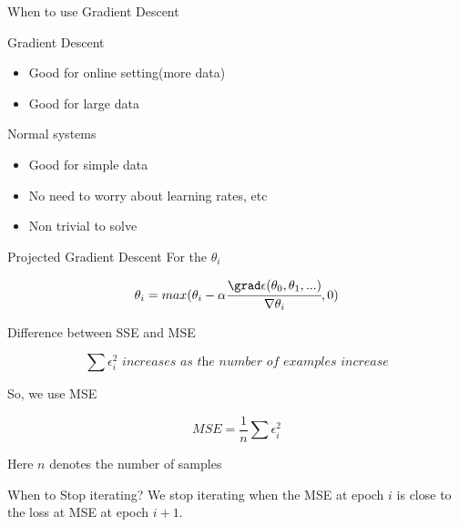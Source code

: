 \documentclass{beamer}
\begin{document}
\begin{frame}{When to use Gradient Descent}


Gradient Descent
\begin{itemize}
    \item Good for online setting(more data)
    \item Good for large data
\end{itemize}


Normal systems
\begin{itemize}
    \item Good for simple data
    \item No need to worry about learning rates, etc
    \item Non trivial to solve
\end{itemize}
\end{frame}



\begin{frame}{Projected Gradient Descent}
    For the $\theta_{i}$
    
    \begin{equation*}
        \theta_{i} = max(\theta_{i} - \alpha \cfrac{\grad \epsilon (\theta_{0},\theta_{1},...)}{ \nabla  \theta_{i}},0)
    \end{equation*}
\end{frame}

\begin{frame}{Difference between SSE and MSE}
    
    
    
    \begin{equation*}
        \sum \epsilon_{i}^{2} \textit{ increases as the number of examples increase}
    \end{equation*}
    
    So, we use MSE
    
    \begin{equation*}
        \textit{MSE} = \frac{1}{n} \sum \epsilon_{i}^{2}
    \end{equation*}
    
    Here $n$ denotes the number of samples
    
    
    
\end{frame}

\begin{frame}{When to Stop iterating?}
    We stop iterating when the MSE at epoch $i$ is close to the loss at MSE at epoch $i+1$.
\end{frame}
\end{document}
